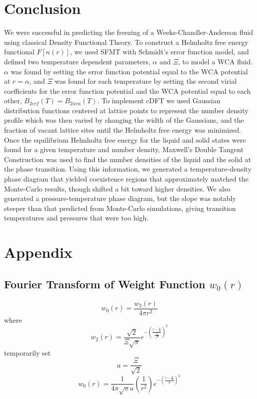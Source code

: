 \documentclass[double,12pt]{beavtex}
\begin{document}
\chapter{Conclusion}
We were successful in predicting the freezing of a Weeks-Chandler-Anderson 
fluid using classical Density Functional Theory. To construct a Helmholtz 
free energy functional $F[n(r)]$, we used SFMT with Schmidt's error 
function model, and defined two temperature dependent parameters, $\alpha$ 
and $\Xi$, to model a WCA fluid. 
$\alpha$ was found by setting the error function potential equal to the 
WCA potential at $r=\alpha$, and $\Xi$ was found for each temperature by 
setting the second virial coefficients for the error function potential 
and the WCA potential equal to each other, $B_{2erf}(T)=B_{2wca}(T)$.
To implement cDFT we used Gaussian distribution functions centered at 
lattice points to represent the number density profile which was then varied
by changing the width of the Gaussians, and the fraction of vacant lattice
sites until the Helmholtz free energy was minimized. Once the equilibrium 
Helmholtz free energy for the liquid and solid states were found for a given
temperature and number density, Maxwell's Double Tangent Construction 
was used to find the number densities of the liquid and the solid at 
the phase transition.
Using this information, we generated a temperature-density 
phase diagram that yielded coexistence regions that approximately 
matched the Monte-Carlo
results, though shifted a bit toward higher densities. 
We also generated a pressure-temperature
phase diagram, but the slope was notably steeper than that
predicted from Monte-Carlo simulations, giving transition 
temperatures and pressures that were too high. 



\backmatter

\chapter{Appendix}

\section{Fourier Transform of Weight Function $w_0(r)$}
\begin{equation}{w_0(r)=\frac{w_2(r)}{4{\pi}r^2}}\end{equation}
where
\begin{equation}{w_2(r)=\frac{\sqrt{2}}{\Xi\sqrt{\pi}}e^{-\left(\frac{r-\frac{\alpha}{2}}{\frac{\Xi}{\sqrt{2}}}\right)^2}}\end{equation}
temporarily set 
\begin{equation}{a=\frac{\Xi}{\sqrt{2}}}\end{equation}
\begin{equation}{w_0(r)=\frac{1}{4{\pi}\sqrt{\pi}a}\left(\frac{1}{r^2}\right)e^{-\left(\frac{r-\frac{\alpha}{2}}{a}\right)^2}}\end{equation}
\end{document}
